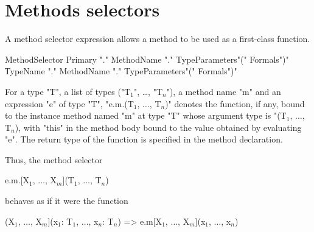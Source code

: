 \section{Methods selectors}
\label{MethodSelectors}

A method selector expression allows a method to be used as a
first-class function.

\begin{grammar}
MethodSelector \:
        Primary \xcd"."
        MethodName \xcd"."
                TypeParameters\opt \xcd"(" Formals\opt \xcd")" \\
      \|
        TypeName \xcd"."
        MethodName \xcd"."
                TypeParameters\opt \xcd"(" Formals\opt \xcd")" \\
\end{grammar}

For a
type \xcd"T", a list of types
(\xcdmath"T$_1$", \dots, \xcdmath"T$_n$"), 
a method name
\xcd"m" and an expression \xcd"e" of type \xcd"T",
\xcdmath"e.m.(T$_1$, $\dots$, T$_n$)" denotes the function,
if any, bound to the instance method named \xcd"m" at type
\xcd"T" whose argument
type is
\xcdmath"(T$_1$, $\dots$, T$_n$), with \xcd"this" in the method
body bound to the value obtained
by evaluating \xcd"e". The
return type of the function is specified in the method declaration.

Thus, the method selector

\begin{xtenmath}
e.m.[X$_1$, $\dots$, X$_m$](T$_1$, $\dots$, T$_n$)
\end{xtenmath}

behaves as if it were the function

\begin{xtenmath}
(X$_1$, $\dots$, X$_m$](x$_1$: T$_1$, $\dots$, x$_n$: T$_n$) => e.m[X$_1$, $\dots$, X$_m$](x$_1$, $\dots$, x$_n$)
\end{xtenmath}

